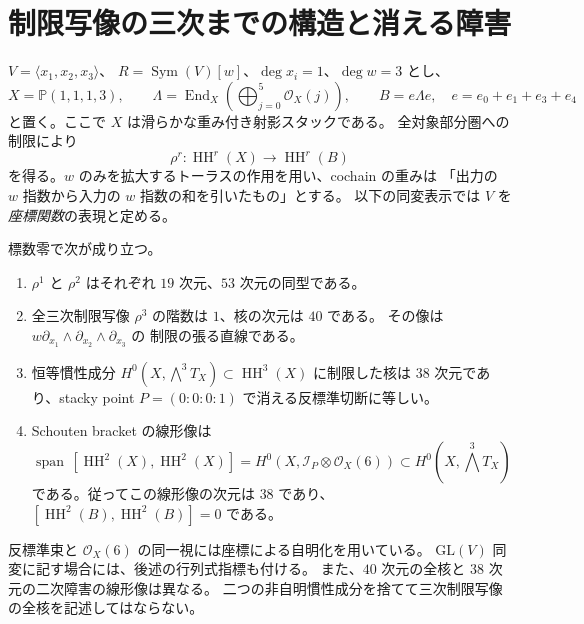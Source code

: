 \section{制限写像の三次までの構造と消える障害}
\label{sec:v31c-restriction}

$V=\langle x_1,x_2,x_3\rangle$、
$R=\operatorname{Sym}(V)[w]$、$\deg x_i=1$、$\deg w=3$ とし、
\[
 X=\mathbb P(1,1,1,3),\qquad
 \Lambda=\operatorname{End}_X\!\left(\bigoplus_{j=0}^{5}\mathcal O_X(j)\right),
 \qquad B=e\Lambda e,\quad e=e_0+e_1+e_3+e_4
\]
と置く。ここで $X$ は滑らかな重み付き射影スタックである。
全対象部分圏への制限により
\[
 \rho^r:\operatorname{HH}^r(X)\longrightarrow\operatorname{HH}^r(B)
\]
を得る。$w$ のみを拡大するトーラスの作用を用い、cochain の重みは
「出力の $w$ 指数から入力の $w$ 指数の和を引いたもの」とする。
以下の同変表示では $V$ を\emph{座標関数}の表現と定める。

\begin{theorem}\label{thm:v31c-restriction}
標数零で次が成り立つ。
\begin{enumerate}
\item $\rho^1$ と $\rho^2$ はそれぞれ $19$ 次元、$53$ 次元の同型である。
\item 全三次制限写像 $\rho^3$ の階数は $1$、核の次元は $40$ である。
その像は $w\partial_{x_1}\wedge\partial_{x_2}\wedge\partial_{x_3}$ の
制限の張る直線である。
\item 恒等慣性成分
$H^0(X,\bigwedge^3T_X)\subset\operatorname{HH}^3(X)$ に制限した核は
$38$ 次元であり、stacky point $P=(0:0:0:1)$ で消える反標準切断に等しい。
\item Schouten bracket の線形像は
\[
 \operatorname{span}\,[\operatorname{HH}^2(X),\operatorname{HH}^2(X)]
 =H^0(X,\mathcal I_P\otimes\mathcal O_X(6))
 \subset H^0(X,\textstyle\bigwedge^3T_X)
\]
である。従ってこの線形像の次元は $38$ であり、
$[\operatorname{HH}^2(B),\operatorname{HH}^2(B)]=0$ である。
\end{enumerate}
\end{theorem}

反標準束と $\mathcal O_X(6)$ の同一視には座標による自明化を用いている。
$\mathrm{GL}(V)$ 同変に記す場合には、後述の行列式指標も付ける。
また、$40$ 次元の全核と $38$ 次元の二次障害の線形像は異なる。
二つの非自明慣性成分を捨てて三次制限写像の全核を記述してはならない。

